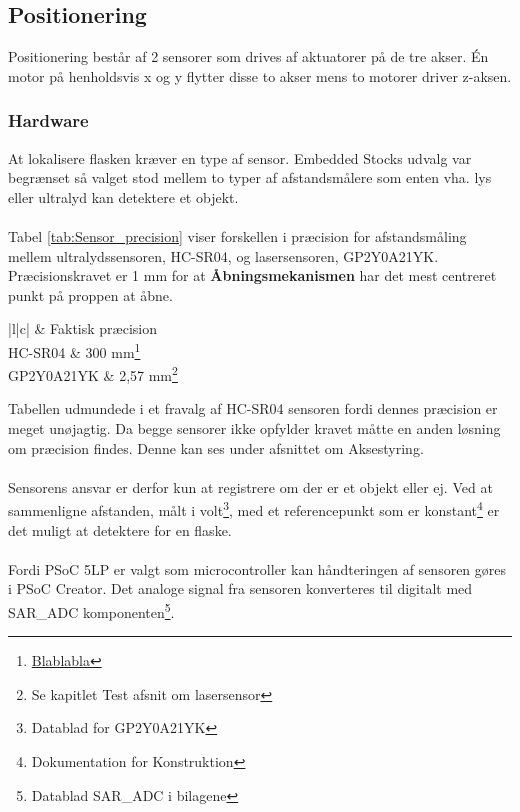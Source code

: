 \subsection{Positionering}
Positionering består af 2 sensorer som drives af aktuatorer på de tre akser. Én motor på henholdsvis x og y flytter disse to akser mens to motorer driver z-aksen.

\subsubsection{Hardware}
At lokalisere flasken kræver en type af sensor. Embedded Stocks udvalg var begrænset så valget stod mellem to typer af afstandsmålere som enten vha. lys eller ultralyd kan detektere et objekt.
\\
\\
Tabel \ref{tab:Sensor_precision} viser forskellen i præcision for afstandsmåling mellem ultralydssensoren, HC-SR04, og  lasersensoren, GP2Y0A21YK. Præcisionskravet er 1 mm for at \textbf{Åbningsmekanismen} har det mest centreret punkt på proppen at åbne.

\begin{table}[H]
	\centering
	\begin{tabular}{ |l|c| }
  		\hline
   		& Faktisk præcision \\
  		\hline 
  		HC-SR04 & 300 mm\footnote{\href{https://www.elextra.dk/main.aspx?page=article&artno=H16466}{Blablabla}} \\
  		\hline
  		GP2Y0A21YK  & 2,57 mm\footnote{Se kapitlet Test afsnit om lasersensor} \\
  		\hline
	\end{tabular}
	\caption{De to sensores præcision}
	\label{tab:Sensor_precision}
\end{table}

\noindent
Tabellen udmundede i et fravalg af HC-SR04 sensoren fordi dennes præcision er meget unøjagtig. Da begge sensorer ikke opfylder kravet måtte en anden løsning om præcision findes. Denne kan ses under afsnittet om Aksestyring.
\\
\\
Sensorens ansvar er derfor kun at registrere om der er et objekt eller ej. Ved at sammenligne afstanden, målt i volt\footnote{Datablad for GP2Y0A21YK}, med et referencepunkt som er konstant\footnote{Dokumentation for Konstruktion} er det muligt at detektere for en flaske.
\\
\\
Fordi PSoC 5LP er valgt som microcontroller kan håndteringen af sensoren gøres i PSoC Creator. Det analoge signal fra sensoren konverteres til digitalt med SAR\_ADC komponenten\footnote{Datablad SAR\_ADC i bilagene}.

